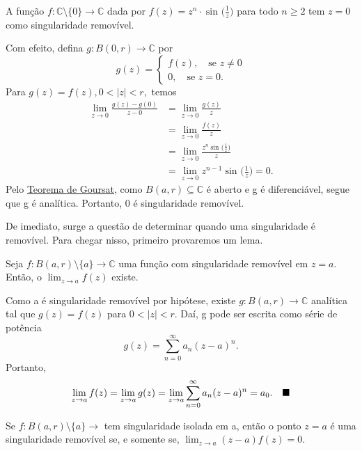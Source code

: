 \documentclass[complex.tex]{subfiles}
\begin{document}
\begin{example}
	A função \(f:\mathbb{C}\setminus{\{0\}}\rightarrow \mathbb{C}\) dada por \(f(z) = z^{n}\cdot \sin^{}{\biggl(\frac{1}{z}\biggr)}\) para todo \(n \geq 2\) tem
	\(z=0\) como singularidade removível.

	Com efeito, defina \(g:B(0, r)\rightarrow \mathbb{C}\) por
	\[
		g(z) = \left\{\begin{array}{ll}
			f(z),\quad \text{se }z\neq 0 \\
			0,\quad \text{se } z = 0.
		\end{array}\right.
	\]
	Para \(g(z) = f(z), 0 < |z| < r,\) temos
	\begin{align*}
		\lim_{z\to 0}\frac{g(z)-g(0)}{z-0} & = \lim_{z\to 0}\frac{g(z)}{z}                                    \\
		                                   & = \lim_{z\to 0}\frac{f(z)}{z}                                    \\
		                                   & = \lim_{z\to 0}\frac{z^{n}\sin^{}{\biggl(\frac{1}{z}\biggr)}}{z} \\
		                                   & = \lim_{z\to 0} z^{n-1}\sin^{}{\biggl(\frac{1}{z}\biggr)} = 0.
	\end{align*}
	Pelo \hyperlink{goursat}{Teorema de Goursat}, como \(B(a, r)\subseteq \mathbb{C}\) é aberto e g é diferenciável, segue que g é analítica.
	Portanto, 0 é singularidade removível.
\end{example}
De imediato, surge a questão de determinar quando uma singularidade é removível. Para chegar nisso, primeiro provaremos um lema.
\begin{lmm*}
	Seja \(f:B(a, r)\setminus{\{a\}}\rightarrow \mathbb{C}\) uma função com singularidade removível em \(z = a\). Então, o \(\lim_{z\to a}f(z)\) existe.
\end{lmm*}
\begin{proof*}
	Como a é singularidade removível por hipótese, existe \(g:B(a, r)\rightarrow \mathbb{C}\) analítica
	tal que \(g(z) = f(z)\) para \(0 < |z| < r.\) Daí, g pode ser escrita como série de potência
	\[
		g(z) = \sum\limits_{n=0}^{\infty}a_{n}(z-a)^{n}.
	\]
	Portanto,
	\[
		\lim_{z\to a}f(z) = \lim_{z\to a} g(z) = \lim_{z\to a}\sum\limits_{n=0}^{\infty}a_{n}(z-a)^{n} = a_{0}.\quad \text{$\blacksquare$}
	\]
\end{proof*}
\begin{theorem*}
	Se \(f:B(a, r)\setminus{\{a\}}\rightarrow \) tem singularidade isolada em a, então o ponto \(z=a\) é uma singularidade removível se, e somente se,
	\(\lim_{z\to a} (z-a)f(z) = 0.\)
\end{theorem*}
\end{document}
